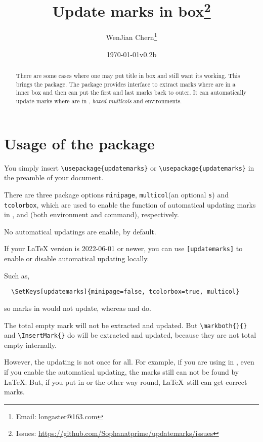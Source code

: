 \documentclass{l3doc}
\title{Update marks in box\thanks{Issues: \url{https://github.com/Sophanatprime/updatemarks/issues}}}
\author{WenJian Chern\thanks{Email: longaster@163.com}}
\date{\today\qquad v0.2b}
\begin{document}
\maketitle

\begin{abstract}
There are some cases where one may put title in box and still want its 
 working. This brings the  package.
The  package provides interface to extract marks where are in a 
inner box and then can put the first and last marks back to outer.
It can automatically update marks where are in , 
\textit{boxed multicols} and  environments.
\end{abstract}


\tableofcontents


\section{Usage of the package}

You simply insert \verb|\usepackage{updatemarks}| or 
\verb|\usepackage|\verb|{updatemarks}| in the preamble of your document.

There are three package options \texttt{minipage}, 
\texttt{multicol}(an optional \texttt s) and 
\texttt{tcolorbox}, which are used to enable the function of automatical updating marks
in ,  and 
 (both  environment and  command), respectively.

No automatical updatings are enable, by default.

If your {\LaTeX} version is 2022-06-01 or newer, you can use 
\texttt{[updatemarks]} to enable or disable
automatical updating locally.

Such as,
\begin{verbatim}
  \SetKeys[updatemarks]{minipage=false, tcolorbox=true, multicol}
\end{verbatim}
so marks in  would not update, 
whereas  and  do.

The total empty mark will not be extracted and updated.
But \verb|\markboth{}{}| and \verb|\InsertMark{}| do will be extracted and updated,
because they are not total empty internally.

However, the updating is not once for all.
For example, if you are using  in , even if you enable
the automatical updating, the marks still can not be found by \LaTeX.
But, if you put  in  or the other way round, 
\LaTeX\ still can get correct marks.
\end{document}
